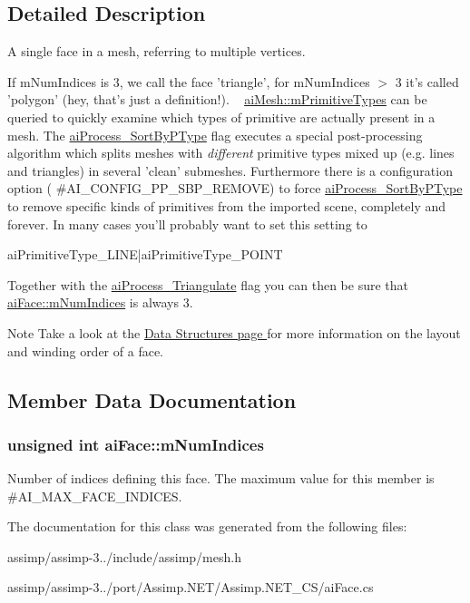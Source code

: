 \subsection{Detailed Description}
A single face in a mesh, referring to multiple vertices. 

If m\+Num\+Indices is 3, we call the face 'triangle', for m\+Num\+Indices $>$ 3 it's called 'polygon' (hey, that's just a definition!). ~\newline
 \hyperlink{structai_mesh_a99d66ac0a444068c1b252b30265cbf53}{ai\+Mesh\+::m\+Primitive\+Types} can be queried to quickly examine which types of primitive are actually present in a mesh. The \hyperlink{postprocess_8h_a64795260b95f5a4b3f3dc1be4f52e410ab4484f73635d633cd79973bac1431ed6}{ai\+Process\+\_\+\+Sort\+By\+P\+Type} flag executes a special post-\/processing algorithm which splits meshes with {\itshape different} primitive types mixed up (e.\+g. lines and triangles) in several 'clean' submeshes. Furthermore there is a configuration option ( \#\+A\+I\+\_\+\+C\+O\+N\+F\+I\+G\+\_\+\+P\+P\+\_\+\+S\+B\+P\+\_\+\+R\+E\+M\+O\+V\+E) to force \hyperlink{postprocess_8h_a64795260b95f5a4b3f3dc1be4f52e410ab4484f73635d633cd79973bac1431ed6}{ai\+Process\+\_\+\+Sort\+By\+P\+Type} to remove specific kinds of primitives from the imported scene, completely and forever. In many cases you'll probably want to set this setting to 
\begin{DoxyCode}
aiPrimitiveType\_LINE|aiPrimitiveType\_POINT
\end{DoxyCode}
 Together with the \hyperlink{postprocess_8h_a64795260b95f5a4b3f3dc1be4f52e410a9c3de834f0307f31fa2b1b6d05dd592b}{ai\+Process\+\_\+\+Triangulate} flag you can then be sure that \hyperlink{structai_face_adda2698cec0ebfe651572f4a5701360b}{ai\+Face\+::m\+Num\+Indices} is always 3. \begin{DoxyNote}{Note}
Take a look at the \hyperlink{data}{Data Structures page } for more information on the layout and winding order of a face. 
\end{DoxyNote}


\subsection{Member Data Documentation}
\hypertarget{structai_face_adda2698cec0ebfe651572f4a5701360b}{
\subsubsection[{m\+Num\+Indices}]{\setlength{\rightskip}{0pt plus 5cm}unsigned int ai\+Face\+::m\+Num\+Indices}}\label{structai_face_adda2698cec0ebfe651572f4a5701360b}
Number of indices defining this face. The maximum value for this member is \#\+A\+I\+\_\+\+M\+A\+X\+\_\+\+F\+A\+C\+E\+\_\+\+I\+N\+D\+I\+C\+E\+S. 

The documentation for this class was generated from the following files\+:\begin{DoxyCompactItemize}
\item 
assimp/assimp-\/3../include/assimp/mesh.\+h\item 
assimp/assimp-\/3../port/\+Assimp.\+N\+E\+T/\+Assimp.\+N\+E\+T\+\_\+\+C\+S/ai\+Face.\+cs\end{DoxyCompactItemize}
